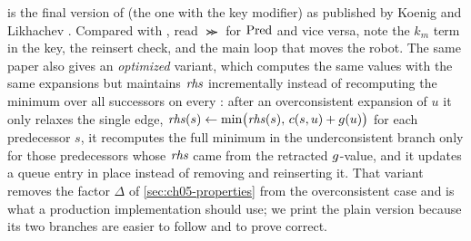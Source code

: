  is the final version of \dstarlite (the one with the key
modifier) as published by Koenig and Likhachev \cite{koenig2002dstarlite}. Compared
with \lpastar, read $\Succ$ for $\operatorname{Pred}$ and vice versa, note the $k_m$ term in the key,
the reinsert check, and the main loop that moves the robot. The same paper also gives an
\emph{optimized} variant, which computes the same values
with the same expansions but maintains $\mathit{rhs}$ incrementally instead of recomputing the
minimum over all successors on every \DslUpdateVertex: after an overconsistent expansion
of $u$ it only relaxes the single edge, $\mathit{rhs}(s) \gets \min\bigl(\mathit{rhs}(s),\,c(s,u)+g(u)\bigr)$
for each predecessor $s$, it recomputes the full minimum in the underconsistent branch
only for those predecessors whose $\mathit{rhs}$ came from the retracted $g$-value, and it
updates a queue entry in place instead of removing and reinserting it. That variant
removes the factor $\Delta$ of \cref{sec:ch05-properties} from the overconsistent case
and is what a production implementation should use; we print the plain version because
its two branches are easier to follow and to prove correct.

